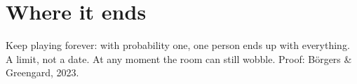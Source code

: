 \section{Where it ends}

Keep playing forever: with probability one, one person ends up with everything.
A limit, not a date. At any moment the room can still wobble.
Proof: Börgers \& Greengard, 2023.
